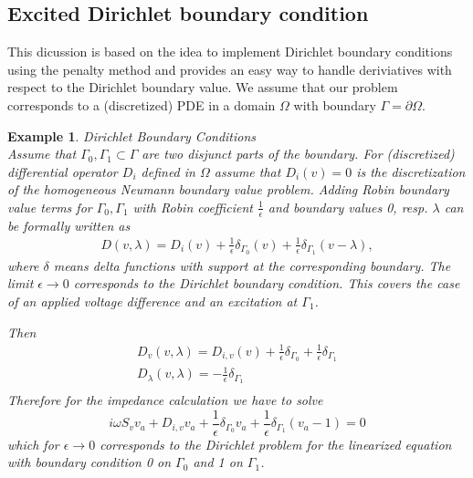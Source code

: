 \documentclass[12pt]{amsproc}
\newtheorem{example}{Example}
\begin{document}
\subsection{Excited Dirichlet boundary condition}
This dicussion is based on the idea to implement Dirichlet boundary conditions using the
penalty method and provides an easy way to handle deriviatives with respect to
the Dirichlet boundary value. We assume that our problem corresponds to a (discretized) PDE
in a domain $\Omega$ with boundary $\Gamma=\partial\Omega$.
\begin{example}{Dirichlet Boundary Conditions}\\
  Assume that $\Gamma_0,\Gamma_1\subset \Gamma$  are two disjunct parts of
  the boundary.
  For (discretized) differential operator $D_i$ defined
  in $\Omega$ assume that $D_i(v)=0$ is the discretization of the
  homogeneous Neumann boundary value problem. Adding Robin boundary value terms
  for $\Gamma_0, \Gamma_1$ with Robin coefficient $\frac1\epsilon$ and boundary values
  0, resp. $\lambda$ can be formally
  written as
  \begin{align*}
  D(v,\lambda)= D_i(v)
  +\frac1\epsilon\delta_{\Gamma_0}(v)
  +\frac1\epsilon\delta_{\Gamma_1}(v-\lambda),    
  \end{align*}
  where $\delta$ means delta functions with support at the corresponding boundary.
  The limit $\epsilon\to 0$  corresponds to the Dirichlet boundary condition.
  This covers the case of an
  applied voltage difference  and an excitation at $\Gamma_1$.
  

  Then  
\begin{equation*}
  \begin{split}
    D_v(v,\lambda)= D_{i,v}(v)+ \frac1\epsilon\delta_{\Gamma_0}+ \frac1\epsilon\delta_{\Gamma_1}\\
    D_\lambda(v,\lambda)= -\frac1\epsilon\delta_{\Gamma_1}\\
   \end{split}
\end{equation*}
Therefore  for the impedance calculation we have to solve 
\begin{equation*}
  i\omega S_v v_a + D_{i,v} v_a +\frac1\epsilon\delta_{\Gamma_0}v_a +\frac1\epsilon\delta_{\Gamma_1}(v_a-1) =0
\end{equation*}
which for $\epsilon\to 0$ corresponds to the Dirichlet problem  for the linearized equation 
with boundary condition 0 on $\Gamma_0$ and 1 on $\Gamma_1$.
\end{example}
\end{document}
